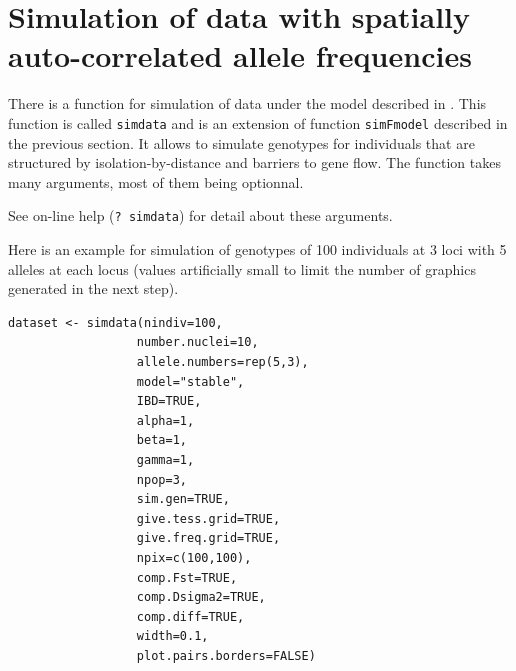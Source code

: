\documentclass[a4paper,10pt]{article}
\begin{document}
\clearpage
\section[ Spatially correlated frequencies]{Simulation of data with spatially auto-correlated allele frequencies }\label{sim-IBD}

There is a function for simulation of data under the model described in \citep{Guillot09a}. 
This function is called {\tt simdata} and is an extension of function {\tt simFmodel} described in the previous section. It allows to simulate 
genotypes for individuals that are structured by isolation-by-distance and barriers to gene flow.
The function takes many arguments, most of them being optionnal. 


See on-line help ({\tt ? simdata}) for detail about these arguments.

Here is an example for simulation of genotypes of 100 individuals at 3 loci with 5 alleles at each locus 
(values artificially small to limit the number of graphics generated in the next step). 

\begin{verbatim}
dataset <- simdata(nindiv=100,
                  number.nuclei=10,
                  allele.numbers=rep(5,3),
                  model="stable",
                  IBD=TRUE,
                  alpha=1,
                  beta=1,
                  gamma=1,
                  npop=3,
                  sim.gen=TRUE,
                  give.tess.grid=TRUE,
                  give.freq.grid=TRUE,
                  npix=c(100,100),
                  comp.Fst=TRUE,
                  comp.Dsigma2=TRUE,
                  comp.diff=TRUE,
                  width=0.1,
                  plot.pairs.borders=FALSE)
\end{verbatim}
\end{document}
